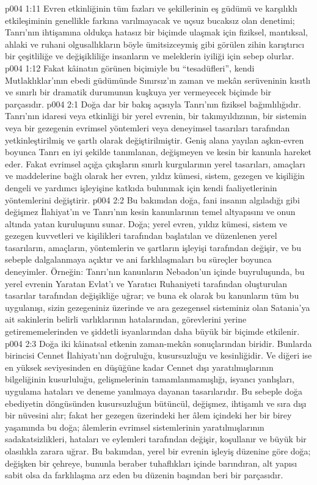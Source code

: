 \vs p004 1:11 Evren etkinliğinin tüm fazları ve şekillerinin eş güdümü ve karşılıklı etkileşiminin genellikle farkına varılmayacak ve uçsuz bucaksız olan denetimi; Tanrı’nın ihtişamına oldukça hatasız bir biçimde ulaşmak için fiziksel, mantıksal, ahlaki ve ruhani olgusallıkların böyle ümitsizceymiş gibi görülen zihin karıştırıcı bir çeşitliliğe ve değişikliliğe insanların ve meleklerin iyiliği için sebep olurlar.
\vs p004 1:12 Fakat kâinatın görünen biçimiyle bu “tesadüfleri”, kendi Mutlaklıklar’ının ebedi güdümünde Sınırsız’ın zaman ve mekân serüveninin kısıtlı ve sınırlı bir dramatik durumunun kuşkuya yer vermeyecek biçimde bir parçasıdır.
\vs p004 2:1 Doğa dar bir bakış açısıyla Tanrı’nın fiziksel bağımlılığıdır. Tanrı’nın idaresi veya etkinliği bir yerel evrenin, bir takımyıldızının, bir sistemin veya bir gezegenin evrimsel yöntemleri veya deneyimsel tasarıları tarafından yetkinleştirilmiş ve şartlı olarak değiştirilmiştir. Geniş alana yayılan aşkın\hyp{}evren boyunca Tanrı en iyi şekilde tanımlanan, değişmeyen ve kesin bir kanunla hareket eder. Fakat evrimsel açığa çıkışların sınırlı kurgularının yerel tasarıları, amaçları ve maddelerine bağlı olarak her evren, yıldız kümesi, sistem, gezegen ve kişiliğin dengeli ve yardımcı işleyişine katkıda bulunmak için kendi faaliyetlerinin yöntemlerini değiştirir.
\vs p004 2:2 Bu bakımdan doğa, fani insanın algıladığı gibi değişmez İlahiyat’ın ve Tanrı’nın kesin kanunlarının temel altyapısını ve onun altında yatan kuruluşunu sunar. Doğa; yerel evren, yıldız kümesi, sistem ve gezegen kuvvetleri ve kişilikleri tarafından başlatılan ve düzenlenen yerel tasarıların, amaçların, yöntemlerin ve şartların işleyişi tarafından değişir, ve bu sebeple dalgalanmaya açıktır ve ani farklılaşmaları bu süreçler boyunca deneyimler. Örneğin: Tanrı’nın kanunların Nebadon’un içinde buyruluşunda, bu yerel evrenin Yaratan Evlat’ı ve Yaratıcı Ruhaniyeti tarafından oluşturulan tasarılar tarafından değişikliğe uğrar; ve buna ek olarak bu kanunların tüm bu uygulanışı, sizin gezegeniniz üzerinde ve ara gezegensel sisteminiz olan Satania’ya ait sakinlerin belirli varlıklarının hatalarından, görevlerini yerine getirememelerinden ve şiddetli isyanlarından daha büyük bir biçimde etkilenir.
\vs p004 2:3 Doğa iki kâinatsal etkenin zaman\hyp{}mekân sonuçlarından biridir. Bunlarda birincisi Cennet İlahiyatı’nın doğruluğu, kusursuzluğu ve kesinliğidir. Ve diğeri ise en yüksek seviyesinden en düşüğüne kadar Cennet dışı yaratılmışlarının bilgeliğinin kusurluluğu, gelişmelerinin tamamlanmamışlığı, isyancı yanlışları, uygulama hataları ve deneme yanılmaya dayanan tasarılarıdır. Bu sebeple doğa ebediyetin döngüsünden kusursuzluğun bütüncül, değişmez, ihtişamlı ve sıra dışı bir nüvesini alır; fakat her gezegen üzerindeki her âlem içindeki her bir birey yaşamında bu doğa; âlemlerin evrimsel sistemlerinin yaratılmışlarının sadakatsizlikleri, hataları ve eylemleri tarafından değişir, koşullanır ve büyük bir olasılıkla zarara uğrar. Bu bakımdan, yerel bir evrenin işleyiş düzenine göre doğa; değişken bir çehreye, bununla beraber tuhaflıkları içinde barındıran, alt yapısı sabit olsa da farklılaşma arz eden bu düzenin başından beri bir parçasıdır.
